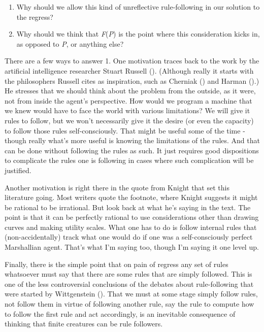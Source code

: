 \documentclass[
  10pt,
  letterpaper,
  DIV=11,
  numbers=noendperiod,
  twoside]{scrartcl}
\providecommand{\tightlist}{%
  \setlength{\itemsep}{0pt}\setlength{\parskip}{0pt}}\usepackage{longtable,booktabs,array}
\begin{document}
\begin{enumerate}
\def\labelenumi{\arabic{enumi}.}
\tightlist
\item
  Why should we allow this kind of unreflective rule-following in our
  solution to the regress?
\item
  Why should we think that \emph{F}(\emph{P}) is the point where this
  consideration kicks in, as opposed to \emph{P}, or anything else?
\end{enumerate}

There are a few ways to answer 1. One motivation traces back to the work
by the artificial intelligence researcher Stuart Russell
(). (Although really it starts with the
philosophers Russell cites as inspiration, such as Cherniak
() and Harman
().) He stresses that we should think
about the problem from the outside, as it were, not from inside the
agent's perspective. How would we program a machine that we knew would
have to face the world with various limitations? We will give it rules
to follow, but we won't necessarily give it the desire (or even the
capacity) to follow those rules self-consciously. That might be useful
some of the time - though really what's more useful is knowing the
limitations of the rules. And that can be done without following the
rules as such. It just requires good dispositions to complicate the
rules one is following in cases where such complication will be
justified.

Another motivation is right there in the quote from Knight that set this
literature going. Most writers quote the footnote, where Knight suggests
it might be rational to be irrational. But look back at what he's saying
in the text. The point is that it can be perfectly rational to use
considerations other than drawing curves and making utility scales. What
one has to do is follow internal rules that (non-accidentally) track
what one would do if one was a self-consciously perfect Marshallian
agent. That's what I'm saying too, though I'm saying it one level up.

Finally, there is the simple point that on pain of regress any set of
rules whatsoever must say that there are some rules that are simply
followed. This is one of the less controversial conclusions of the
debates about rule-following that were started by Wittgenstein
(). That we must at some stage
simply follow rules, not follow them in virtue of following another
rule, say the rule to compute how to follow the first rule and act
accordingly, is an inevitable consequence of thinking that finite
creatures can be rule followers.
\end{document}
